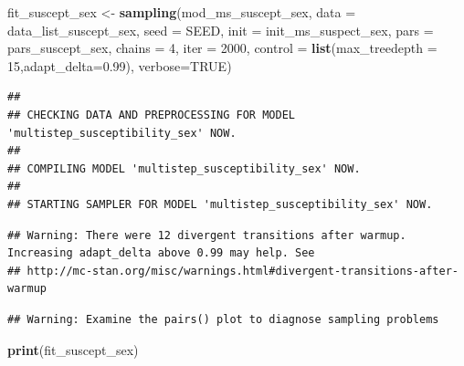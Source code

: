 \documentclass[
]{article}
\newenvironment{Shaded}{\begin{snugshade}}{\end{snugshade}}
\newcommand{\DataTypeTok}[1]{\textcolor[rgb]{0.13,0.29,0.53}{#1}}
\newcommand{\DecValTok}[1]{\textcolor[rgb]{0.00,0.00,0.81}{#1}}
\newcommand{\FloatTok}[1]{\textcolor[rgb]{0.00,0.00,0.81}{#1}}
\newcommand{\KeywordTok}[1]{\textcolor[rgb]{0.13,0.29,0.53}{\textbf{#1}}}
\newcommand{\NormalTok}[1]{#1}
\newcommand{\OtherTok}[1]{\textcolor[rgb]{0.56,0.35,0.01}{#1}}
\newcommand{\StringTok}[1]{\textcolor[rgb]{0.31,0.60,0.02}{#1}}
\begin{document}
\begin{Shaded}
\begin{Highlighting}[]
\NormalTok{fit_suscept_sex <-}\StringTok{ }\KeywordTok{sampling}\NormalTok{(mod_ms_suscept_sex, }\DataTypeTok{data =}\NormalTok{ data_list_suscept_sex, }
                            \DataTypeTok{seed =}\NormalTok{ SEED, }\DataTypeTok{init =}\NormalTok{ init_ms_suspect_sex,}
                   \DataTypeTok{pars =}\NormalTok{ pars_suscept_sex, }\DataTypeTok{chains =} \DecValTok{4}\NormalTok{, }\DataTypeTok{iter =} \DecValTok{2000}\NormalTok{,}
                   \DataTypeTok{control =} \KeywordTok{list}\NormalTok{(}\DataTypeTok{max_treedepth =} \DecValTok{15}\NormalTok{,}\DataTypeTok{adapt_delta=}\FloatTok{0.99}\NormalTok{),}
                   \DataTypeTok{verbose=}\OtherTok{TRUE}\NormalTok{)}
\end{Highlighting}
\end{Shaded}

\begin{verbatim}
## 
## CHECKING DATA AND PREPROCESSING FOR MODEL 'multistep_susceptibility_sex' NOW.
## 
## COMPILING MODEL 'multistep_susceptibility_sex' NOW.
## 
## STARTING SAMPLER FOR MODEL 'multistep_susceptibility_sex' NOW.
\end{verbatim}

\begin{verbatim}
## Warning: There were 12 divergent transitions after warmup. Increasing adapt_delta above 0.99 may help. See
## http://mc-stan.org/misc/warnings.html#divergent-transitions-after-warmup
\end{verbatim}

\begin{verbatim}
## Warning: Examine the pairs() plot to diagnose sampling problems
\end{verbatim}

\begin{Shaded}
\begin{Highlighting}[]
\KeywordTok{print}\NormalTok{(fit_suscept_sex)}
\end{Highlighting}
\end{Shaded}
\end{document}
